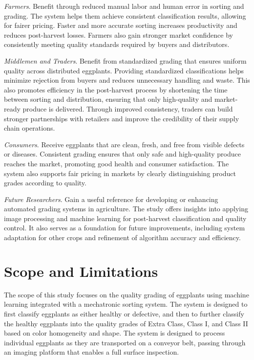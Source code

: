 {\textit{Farmers}. Benefit through reduced manual labor and human error in sorting and grading. The system helps them achieve consistent classification results, allowing for fairer pricing. Faster and more accurate sorting increases productivity and reduces post-harvest losses. Farmers also gain stronger market confidence by consistently meeting quality standards required by buyers and distributors.

\textit{Middlemen and Traders}. Benefit from standardized grading that ensures uniform quality across distributed eggplants. Providing standardized classifications helps minimize rejection from buyers and reduces unnecessary handling and waste. This also promotes efficiency in the post-harvest process by shortening the time between sorting and distribution, ensuring that only high-quality and market-ready produce is delivered. Through improved consistency, traders can build stronger partnerships with retailers and improve the credibility of their supply chain operations.

\textit{Consumers}. Receive eggplants that are clean, fresh, and free from visible defects or diseases. Consistent grading ensures that only safe and high-quality produce reaches the market, promoting good health and consumer satisfaction. The system also supports fair pricing in markets by clearly distinguishing product grades according to quality.

\textit{Future Researchers}. Gain a useful reference for developing or enhancing automated grading systems in agriculture. The study offers insights into applying image processing and machine learning for post-harvest classification and quality control. It also serves as a foundation for future improvements, including system adaptation for other crops and refinement of algorithm accuracy and efficiency.


\section{Scope and Limitations}

The scope of this study focuses on the quality grading of eggplants using machine learning integrated with a mechatronic sorting system. The system is designed to first classify eggplants as either healthy or defective, and then to further classify the healthy eggplants into the quality grades of Extra Class, Class I, and Class II based on color homogeneity and shape. The system is designed to process individual eggplants as they are transported on a conveyor belt, passing through an imaging platform that enables a full surface inspection.

}
